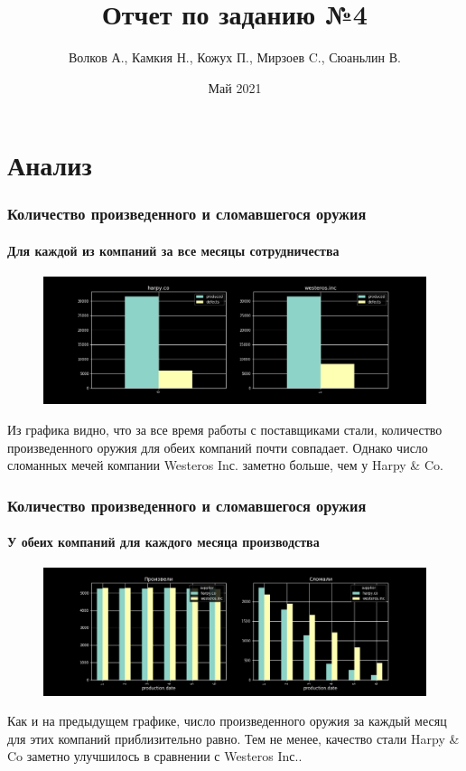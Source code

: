 \documentclass[10pt,pdf,hyperref={unicode}]{beamer}
\title{\huge Отчет по заданию №4}
\author{Волков А., Камкия Н., Кожух П., Мирзоев C., Сюаньлин В.}
\date{Май 2021}
\begin{document}
\frame[plain]{\titlepage}

\section{Анализ}

\begin{frame}
\frametitle{Количество произведенного и сломавшегося оружия}
\framesubtitle{Для каждой из компаний за все месяцы сотрудничества}
\begin{figure}[t]
    \centering
    \includegraphics[width=1.0\textwidth]{6.png}
\end{figure}
Из графика видно, что за все время работы с поставщиками стали, количество произведенного оружия для обеих компаний почти совпадает. Однако число сломанных мечей компании Westeros Inс. заметно больше, чем у Harpy \& Co.
\end{frame}

\begin{frame}
\frametitle{Количество произведенного и сломавшегося оружия}
\framesubtitle{У обеих компаний для каждого месяца производства}
\begin{figure}[t]
    \centering
    \includegraphics[width=1.0\textwidth]{3.png}
\end{figure}
Как и на предыдущем графике, число произведенного оружия за каждый месяц для этих компаний приблизительно равно. Тем не менее, качество стали Harpy \& Co заметно улучшилось в сравнении с Westeros Inс..
\end{frame}
\end{document}
